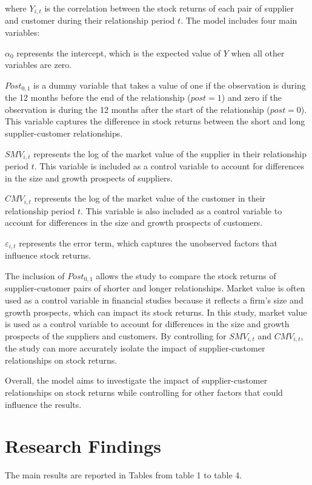 \documentclass[12pt,english]{article}
\begin{document}
where $Y_{i,t}$ is the correlation between the stock returns of each pair of supplier and customer during their relationship period $t$. The model includes four main variables:

$\alpha_{0}$ represents the intercept, which is the expected value of $Y$ when all other variables are zero.

$Post_{0,1}$ is a dummy variable that takes a value of one if the observation is during the 12 months before the end of the relationship ($post=1$) and zero if the observation is during the 12 months after the start of the relationship ($post=0$). This variable captures the difference in stock returns between the short and long supplier-customer relationships.

$SMV_{i,t}$ represents the log of the market value of the supplier in their relationship period $t$. This variable is included as a control variable to account for differences in the size and growth prospects of suppliers.

$CMV_{i,t}$ represents the log of the market value of the customer in their relationship period $t$. This variable is also included as a control variable to account for differences in the size and growth prospects of customers.

$\varepsilon_{i,t}$ represents the error term, which captures the unobserved factors that influence stock returns.

The inclusion of $Post_{0,1}$ allows the study to compare the stock returns of supplier-customer pairs of shorter and longer relationships. Market value is often used as a control variable in financial studies because it reflects a firm's size and growth prospects, which can impact its stock returns. In this study, market value is used as a control variable to account for differences in the size and growth prospects of the suppliers and customers. By controlling for $SMV_{i,t}$ and $CMV_{i,t}$, the study can more accurately isolate the impact of supplier-customer relationships on stock returns.

Overall, the model aims to investigate the impact of supplier-customer relationships on stock returns while controlling for other factors that could influence the results.


\section{Research Findings}\label{sec:results}
The main results are reported in Tables from table 1 to table 4.
\end{document}
